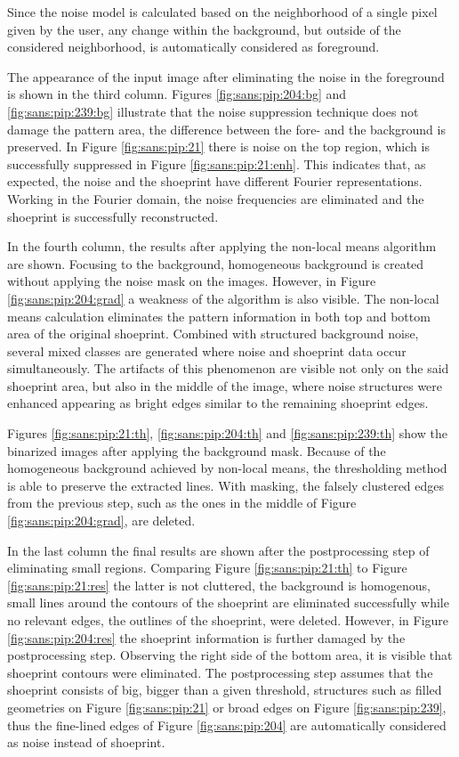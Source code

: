 \documentclass[draft,final]{vutinfth} %
\begin{document}
Since the noise model is calculated based on the neighborhood of a single pixel given by the user, any change within the background, but outside of the considered neighborhood, is automatically considered as foreground.
\par
The appearance of the input image after eliminating the noise in the foreground is shown in the third column.
Figures  \ref{fig:sans:pip:204:bg} and \ref{fig:sans:pip:239:bg} illustrate that the noise suppression technique does not damage the pattern area, the difference between the fore- and the background is preserved.
In Figure \ref{fig:sans:pip:21} there is noise on the top region, which is successfully suppressed in Figure \ref{fig:sans:pip:21:enh}.
This indicates that, as expected, the noise and the shoeprint have different Fourier representations.
Working in the Fourier domain, the noise frequencies are eliminated and the shoeprint is successfully reconstructed.
\par
In the fourth column, the results after applying the non-local means algorithm are shown.
Focusing to the background, homogeneous background is created without applying the noise mask on the images.
However, in Figure \ref{fig:sans:pip:204:grad} a weakness of the algorithm is also visible.
The non-local means calculation eliminates the pattern information in both top and bottom area of the original shoeprint.
Combined with structured background noise, several mixed classes are generated where noise and shoeprint data occur simultaneously.
The artifacts of this phenomenon are visible not only on the said shoeprint area, but also in the middle of the image, where noise structures were enhanced appearing as bright edges similar to the remaining shoeprint edges.
\par
Figures \ref{fig:sans:pip:21:th}, \ref{fig:sans:pip:204:th} and \ref{fig:sans:pip:239:th} show the binarized images after applying the background mask.
Because of the homogeneous background achieved by non-local means, the thresholding method is able to preserve the extracted lines.
With masking, the falsely clustered edges from the previous step, such as the ones in the middle of Figure \ref{fig:sans:pip:204:grad}, are deleted.
\par
In the last column the final results are shown after the postprocessing step of eliminating small regions.
Comparing Figure \ref{fig:sans:pip:21:th} to  Figure \ref{fig:sans:pip:21:res} the latter is not cluttered, the background is homogenous, small lines around the contours of the shoeprint are eliminated successfully while no relevant edges, the outlines of the shoeprint, were deleted.
However, in Figure \ref{fig:sans:pip:204:res} the shoeprint information is further damaged by the postprocessing step.
Observing the right side of the bottom area, it is visible that shoeprint contours were eliminated.
The postprocessing step assumes that the shoeprint consists of big, bigger than a given threshold, structures such as filled geometries on Figure \ref{fig:sans:pip:21} or broad edges on Figure \ref{fig:sans:pip:239}, thus the fine-lined edges of Figure \ref{fig:sans:pip:204} are automatically considered as noise instead of shoeprint.
\end{document}
